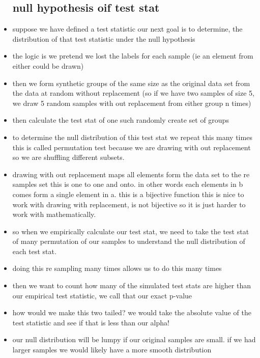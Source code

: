 \documentclass{article}
\begin{document}
\begin{itemize}
\subsection{null hypothesis oif test stat}
\item suppose we have defined a test statistic our next goal is to determine, the distribution of that test statistic under the null hypothesis
\item the logic is we pretend we lost the labels for each sample (ie an element from either could be drawn)
\item then we form synthetic groups of the same size as the original data set from the data at random without replacement (so if we have two samples of size 5, we draw 5 random samples with out replacement from either group n times) 
\item then calculate the test stat of one such randomly create set of groups
\item to determine the null distribution of this test stat we repeat this many times 
\itme this is called permutation test because we are drawing with out replacement so we are shuffling different subsets.
\item drawing with out replacement maps all elements form the data set to the re samples set this is one to one and onto. in other words each elements in b comes form a single element in a. this is a bijective function this is nice to work with 
\itme drawing with replacement, is not bijective so it is just harder to work with mathematically. 
\item so when we empirically calculate our test stat, we need to take the test stat of many permutation of our samples to understand the null distribution of each test stat. 
\item doing this re sampling many times allows us to do this many times 
\item then we want to count how many of the simulated test stats are higher than our empirical test statistic, we call that our exact p-value 
\item how would we make this two tailed? we would take the absolute value of the test statistic and see if that is less than our alpha!
\item our null distribution will be lumpy if our original samples are small. if we had larger samples we would likely have a more smooth distribution


\end{itemize}
\end{document}
